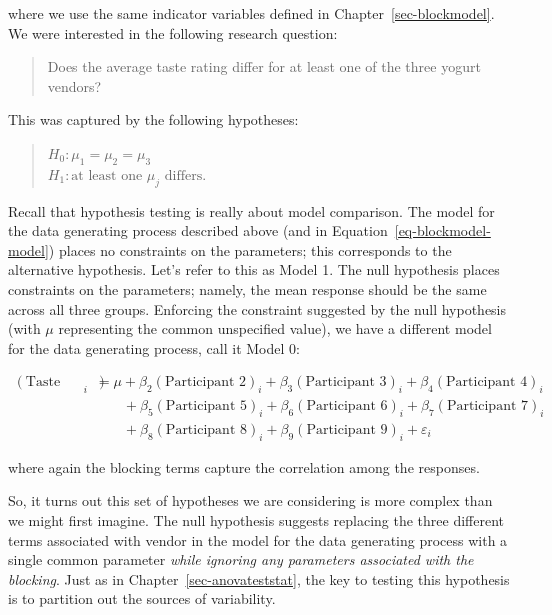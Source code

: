 \documentclass[
  letterpaper,
  DIV=11,
  numbers=noendperiod]{scrreprt}
\theoremstyle{plain}
\theoremstyle{definition}
\theoremstyle{definition}
\theoremstyle{remark}
\begin{document}
where we use the same indicator variables defined in
Chapter~\ref{sec-blockmodel}. We were interested in the following
research question:

\begin{quote}
Does the average taste rating differ for at least one of the three
yogurt vendors?
\end{quote}

This was captured by the following hypotheses:

\begin{quote}
\(H_0: \mu_1 = \mu_2 = \mu_3\)\\
\(H_1: \text{at least one } \mu_j \text{ differs}.\)
\end{quote}

Recall that hypothesis testing is really about model comparison. The
model for the data generating process described above (and in
Equation~\ref{eq-blockmodel-model}) places no constraints on the
parameters; this corresponds to the alternative hypothesis. Let's refer
to this as Model 1. The null hypothesis places constraints on the
parameters; namely, the mean response should be the same across all
three groups. Enforcing the constraint suggested by the null hypothesis
(with \(\mu\) representing the common unspecified value), we have a
different model for the data generating process, call it Model 0:

\[
\begin{aligned}
  (\text{Taste Rating})_i &= \mu + \beta_2 (\text{Participant 2})_i + \beta_3 (\text{Participant 3})_i + \beta_4 (\text{Participant 4})_i \\
    &\qquad + \beta_5 (\text{Participant 5})_i + \beta_6 (\text{Participant 6})_i + \beta_7 (\text{Participant 7})_i \\
    &\qquad + \beta_8 (\text{Participant 8})_i + \beta_9 (\text{Participant 9})_i + \varepsilon_i
\end{aligned}
\]

where again the blocking terms capture the correlation among the
responses.

So, it turns out this set of hypotheses we are considering is more
complex than we might first imagine. The null hypothesis suggests
replacing the three different terms associated with vendor in the model
for the data generating process with a single common parameter
\emph{while ignoring any parameters associated with the blocking}. Just
as in Chapter~\ref{sec-anovateststat}, the key to testing this
hypothesis is to partition out the sources of variability.
\end{document}
